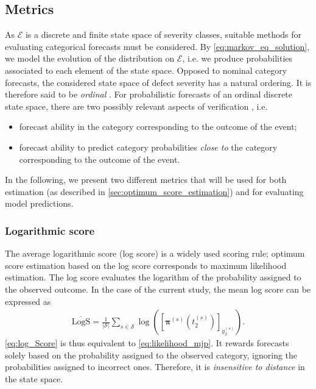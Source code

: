 \documentclass{article}
\begin{document}
\subsection{Metrics} \label{sec:error_metrics}
As $\mathcal{E}$ is a discrete and finite state space of severity classes, suitable methods for evaluating categorical forecasts must be considered. By \cref{eq:markov_eq_solution}, we model the evolution of the distribution on $\mathcal{E}$, i.e. we produce probabilities associated to each element of the state space.
Opposed to nominal category forecasts, the considered state space of defect severity has a natural ordering. It is therefore said to be \textit{ordinal} \citep{broecker2008a,hamill1997}.
For probabilistic forecasts of an ordinal discrete state space, there are two possibly relevant aspects of verification \citep{Weijs2010}, i.e. 
\begin{itemize}
\item forecast ability in the category corresponding to the outcome of the event;
\item forecast ability to predict category probabilities \textit{close to} the category corresponding to the outcome of the event.
\end{itemize} 
In the following, we present two different metrics that will be used for both estimation (as described in \cref{sec:optimum_score_estimation}) and for evaluating model predictions.




\subsubsection{Logarithmic score}
The average logarithmic score (log score) is a widely used scoring rule; optimum score estimation based on the log score corresponds to maximum likelihood estimation. The log score evaluates the logarithm of the probability assigned to the observed outcome. In the case of the current study, the mean log score can be expressed as
\begin{align}
    \overline{\text{LogS}} = \frac{1}{\vert \mathcal{S} \vert} \sum_{s \in \mathcal{S}} \log \left( \left[ \bm{\pi}^{(s)}\left( t_2^{(s)} \right)  \right]_{ y_2^{(s)}} \right).  \label{eq:log_Score}
\end{align}
\cref{eq:log_Score} is thus equivalent to \cref{eq:likelihood_mjp}.
It rewards forecasts solely based on the probability assigned to the observed category, ignoring the probabilities assigned to incorrect ones. Therefore, it is \textit{insensitive to distance} in the state space.  
\end{document}
